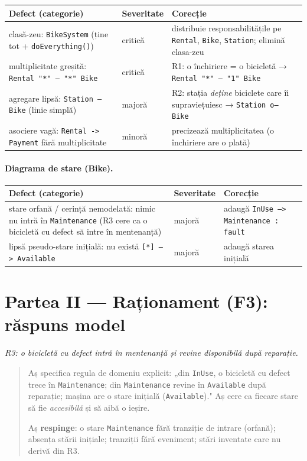 \documentclass[12pt,a4paper]{article}
\begin{document}
\begin{longtable}{p{4.2cm} p{1.8cm} p{6cm}}
\textbf{Defect (categorie)} & \textbf{Severitate} & \textbf{Corecție} \\
\hline
\endhead
clasă-zeu: \texttt{BikeSystem} (ține tot + \texttt{doEverything()}) &
critică & distribuie responsabilitățile pe \texttt{Rental},
\texttt{Bike}, \texttt{Station}; elimină clasa-zeu \\
multiplicitate greșită: \texttt{Rental "*" -- "*" Bike} & critică &
R1: o închiriere = o bicicletă → \texttt{Rental "*" -- "1" Bike} \\
agregare lipsă: \texttt{Station -- Bike} (linie simplă) & majoră &
R2: stația \emph{deține} biciclete care îi supraviețuiesc →
\texttt{Station o-- Bike} \\
asociere vagă: \texttt{Rental -> Payment} fără multiplicitate & minoră &
precizează multiplicitatea (o închiriere are o plată) \\
\end{longtable}

\paragraph{Diagrama de stare (Bike).}

\begin{longtable}{p{4.2cm} p{1.8cm} p{6cm}}
\textbf{Defect (categorie)} & \textbf{Severitate} & \textbf{Corecție} \\
\hline
\endhead
stare orfană / cerință nemodelată: nimic nu intră în
\texttt{Maintenance} (R3 cere ca o bicicletă cu defect să intre în
mentenanță) & majoră & adaugă \texttt{InUse --> Maintenance : fault} \\
lipsă pseudo-stare inițială: nu există \texttt{[*] --> Available} &
majoră & adaugă starea inițială \\
\end{longtable}

\section*{Partea II — Raționament (F3): răspuns model}

\textit{R3: o bicicletă cu defect intră în mentenanță și revine
disponibilă după reparație.}

\begin{quote}
Aș specifica regula de domeniu explicit: „din \texttt{InUse}, o
bicicletă cu defect trece în \texttt{Maintenance}; din
\texttt{Maintenance} revine în \texttt{Available} după reparație;
mașina are o stare inițială (\texttt{Available})." Aș cere ca fiecare
stare să fie \emph{accesibilă} și să aibă o ieșire.

Aș \textbf{respinge}: o stare \texttt{Maintenance} fără tranziție de
intrare (orfană); absența stării inițiale; tranziții fără eveniment;
stări inventate care nu derivă din R3.
\end{quote}
\end{document}
